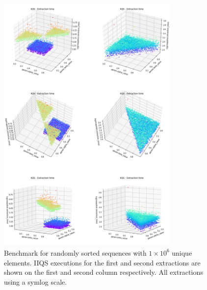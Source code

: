 \begin{figure}[p]
    \centering
    \includegraphics[width=0.8\textwidth]{./fragments/04_experimental_execution/images/04_alphabeta_singleclass.png}
    \caption{Benchmark for randomly sorted sequences with $1\times10^6$ unique elements. IIQS executions for the first and second extractions are shown on the first and second column respectively. All extractions using a symlog scale.}
    \label{FIG:05_ALPHABETA_RELATIONSHIP_RANDOM}
\end{figure}

